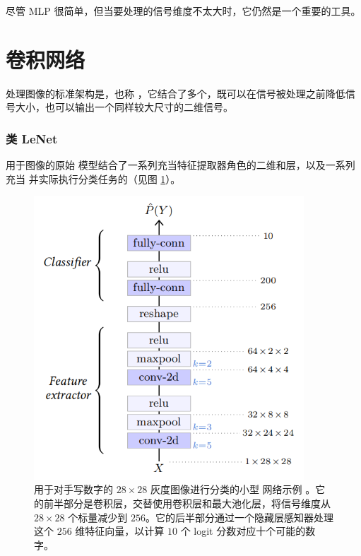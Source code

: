尽管 MLP 很简单，但当要处理的信号维度不太大时，它仍然是一个重要的工具。

\section{卷积网络}\label{sec5.2}

处理图像的标准架构是，也称 ，它结合了多个，既可以在信号被处理之前降低信号大小，也可以输出一个同样较大尺寸的二维信号。

\subsubsection*{类 LeNet}

用于图像的原始  \citep{Lecun98} 模型结合了一系列充当特征提取器角色的二维和层，以及一系列充当  并实际执行分类任务的（见图 \ref{fig5.2}）。

\begin{figure}
    \centering
    \includegraphics[width=0.9\textwidth]{fig/fig5.2.png}
    \caption[类 LeNet 卷积模型]{用于对手写数字的 $28 \times 28$ 灰度图像进行分类的小型  网络示例 \citep{Lecun98}。它的前半部分是卷积层，交替使用卷积层和最大池化层，将信号维度从 $28 \times 28$ 个标量减少到 $256$。它的后半部分通过一个隐藏层感知器处理这个 $256$ 维特征向量，以计算 $10$ 个 logit 分数对应十个可能的数字。}
    \label{fig5.2}
\end{figure}

